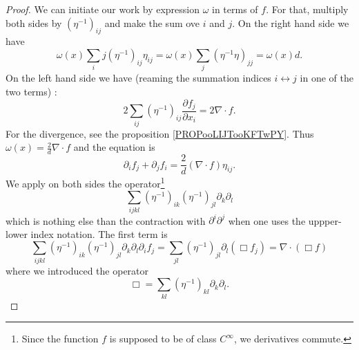 \begin{proof}
    We can initiate our work by expression \( \omega\) in terms of \( f\). For that, multiply both sides by \( (\eta^{-1})_{ij}\) and make the sum ove \( i\) and \( j\). On the right hand side we have
    \begin{equation}
        \omega(x)\sum_ij(\eta^{-1})_{ij}\eta_{ij}=\omega(x)\sum_j(\eta^{-1}\eta)_{jj}=\omega(x)d.
    \end{equation}
    On the left hand side we have (reaming the summation indices \( i\leftrightarrow j\) in one of the two terms) :
    \begin{equation}
        2\sum_{ij}(\eta^{-1})_{ij}\frac{ \partial  f_j }{ \partial x_i }=2\nabla\cdot  f.
    \end{equation}
    For the divergence, see the proposition \ref{PROPooLIJTooKFTwPY}. Thus \( \omega(x)=\frac{ 2 }{ d }\nabla\cdot f\) and the equation is
    \begin{equation}    \label{EQooAPOPooBdKskD}
        \partial_i f_j+\partial_j f_i=\frac{ 2 }{ d }(\nabla\cdot f)\eta_{ij}.
    \end{equation}
    We apply on both sides the operator\footnote{Since the function \( f\) is supposed to be of class \(  C^{\infty}\), we derivatives commute.}
    \begin{equation}
        \sum_{ijkl}(\eta^{-1})_{ik}(\eta^{-1})_{jl}\partial_k\partial_l
    \end{equation}
    which is nothing else than the contraction with \( \partial^i\partial^j\) when one uses the uppper-lower index notation.
    The first term is
    \begin{equation}
        \sum_{ijkl}(\eta^{-1})_{ik}(\eta^{-1})_{jl}\partial_k\partial_l\partial_i f_j=\sum_{jl}(\eta^{-1})_{jl}\partial_l(\Box  f_j)=\nabla\cdot(\Box f)
    \end{equation}
    where we introduced the operator
    \begin{equation}
        \Box=\sum_{kl}(\eta^{-1})_{kl}\partial_k\partial_l.
    \end{equation}


\end{proof}
